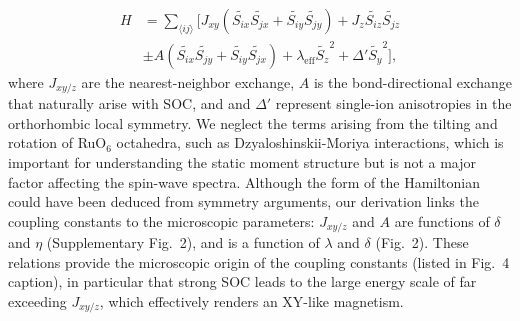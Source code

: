 \begin{align*}
H &= \sum_{\langle ij\rangle } 
[J_{xy} (\tilde{S_{ix}} \tilde{S_{jx}}+\tilde{S_{iy}} \tilde{S_{jy}}) + J_z \tilde{S_{iz}} \tilde{S_{jz}} \\
&\pm A (\tilde{S_{ix}} \tilde{S_{jy}}+\tilde{S_{iy}} \tilde{S_{jx}}) + \lambda_{\mathrm{eff}} \tilde{S_z}^2 +\Delta' \tilde{S_y}^2],
\end{align*}
\noindent
where $J_{xy/z}$ are the nearest-neighbor exchange, $A$ is the bond-directional exchange that naturally arise with SOC, and \leff and $\Delta'$ represent single-ion anisotropies in the orthorhombic local symmetry. We neglect the terms arising from the tilting and rotation of RuO$_6$ octahedra, such as Dzyaloshinskii-Moriya interactions, which is important for understanding the static moment structure but is not a major factor affecting the spin-wave spectra.  Although the form of the Hamiltonian could have been deduced from symmetry arguments, our derivation %
links the coupling constants to the microscopic parameters: $J_{xy/z}$ and $A$ are functions of $\delta$ and $\eta$ (Supplementary Fig.~2), and \leff is a function of $\lambda$ and $\delta$ (Fig.~2). These relations provide the microscopic origin of the coupling constants (listed in Fig.~4 caption), in particular that strong SOC leads to the large energy scale of \leff far exceeding $J_{xy/z}$, which effectively renders an XY-like magnetism.